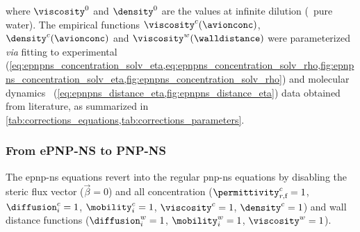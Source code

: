 %
where $\viscosity^0$ and $\density^0$ are the values at infinite dilution (\ie~pure water). The empirical
functions $\viscosity^c(\avionconc)$, $\density^c(\avionconc)$ and $\viscosity^w(\walldistance)$ were
parameterized \textit{via} fitting to experimental~\cite{Hai-Lang-1996}
(\cref{eq:epnpns_concentration_solv_eta,eq:epnpns_concentration_solv_rho,fig:epnpns_concentration_solv_eta,fig:epnpns_concentration_solv_rho})
and molecular dynamics~\cite{Pronk-2014} (\cref{eq:epnpns_distance_eta,fig:epnpns_distance_eta}) data obtained
from literature, as summarized in \cref{tab:corrections_equations,tab:corrections_parameters}.


\subsubsection{From {ePNP-NS} to {PNP-NS}}
%

The \gls{epnp-ns} equations revert into the regular \gls{pnp-ns} equations by disabling the steric flux vector
($\vec{\beta}=0$) and all concentration ($\permittivity_{r,\text{f}}^c=1$, $\diffusion_{i}^c=1$,
$\mobility_{i}^c=1$, $\viscosity^c=1$, $\density^c=1$) and wall distance functions ($\diffusion_{i}^w=1$,
$\mobility_{i}^w=1$, $\viscosity^w=1$).


